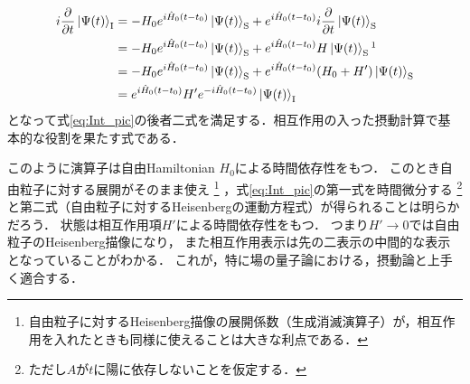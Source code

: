 \documentclass[dvipdfmx,uplatex]{jsarticle}
\numberwithin{theorem}{section}
\numberwithin{reibangou}{section}
\numberwithin{reidaibangou}{section}
\numberwithin{mondaibangou}{section}
\begin{document}
\begin{equation}
    \begin{split}
        i \pdv{t} \ket{\Psi(t)}_\text{I}
        &= - H_0 e^{i \hat{H}_0 (t-t_0)} \ket{\Psi(t)}_\text{S}
        + e^{i \hat{H}_0 (t-t_0)} i \pdv{t} \ket{\Psi(t)}_\text{S} \\
        &= - H_0 e^{i \hat{H}_0 (t-t_0)} \ket{\Psi(t)}_\text{S}
        + e^{i \hat{H}_0 (t-t_0)} H \ket{\Psi(t)}_\text{S} \footnotemark \\
        &= - H_0 e^{i \hat{H}_0 (t-t_0)} \ket{\Psi(t)}_\text{S}
        + e^{i \hat{H}_0 (t-t_0)} (H_0 + H') \ket{\Psi(t)}_\text{S} \\
        &= e^{i \hat{H}_0 (t-t_0)} H' e^{-i \hat{H}_0 (t-t_0)} \ket{\Psi(t)}_\text{I} \\
    \end{split}
\end{equation}
となって式\eqref{eq:Int_pic}の後者二式を満足する．相互作用の入った摂動計算で基本的な役割を果たす式である．


このように演算子は自由Hamiltonian $H_0$による時間依存性をもつ．
このとき自由粒子に対する展開がそのまま使え
\footnote{自由粒子に対するHeisenberg描像の展開係数（生成消滅演算子）が，相互作用を入れたときも同様に使えることは大きな利点である．}
，式\eqref{eq:Int_pic}の第一式を時間微分する
\footnote{ただし$A$が$t$に陽に依存しないことを仮定する．}
と第二式（自由粒子に対するHeisenbergの運動方程式）が得られることは明らかだろう．
状態は相互作用項$H'$による時間依存性をもつ．
つまり$H' \to 0$では自由粒子のHeisenberg描像になり，
また相互作用表示は先の二表示の中間的な表示となっていることがわかる．
これが，特に場の量子論における，摂動論と上手く適合する．
\end{document}
